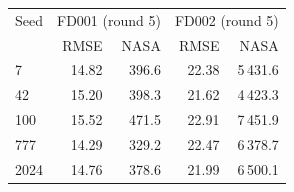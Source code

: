 \begin{tabular}{lrrrr}\toprule
Seed & \multicolumn{2}{c}{FD001 (round 5)} & \multicolumn{2}{c}{FD002 (round 5)} \\
& RMSE & NASA & RMSE & NASA \\\midrule
7 & 14.82 & 396.6 & 22.38 & 5\,431.6 \\
42 & 15.20 & 398.3 & 21.62 & 4\,423.3 \\
100 & 15.52 & 471.5 & 22.91 & 7\,451.9 \\
777 & 14.29 & 329.2 & 22.47 & 6\,378.7 \\
2024 & 14.76 & 378.6 & 21.99 & 6\,500.1 \\
\midrule
\bottomrule\end{tabular}
